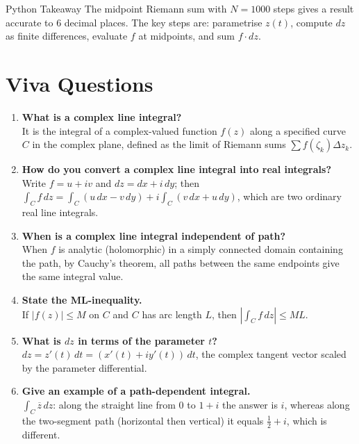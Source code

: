 \documentclass[12pt,a4paper]{article}
\begin{document}
\begin{learnbox}{Python Takeaway}
The midpoint Riemann sum with $N=1000$ steps gives a result accurate to
6 decimal places. The key steps are: parametrise $z(t)$, compute $dz$ as
finite differences, evaluate $f$ at midpoints, and sum $f \cdot dz$.
\end{learnbox}

\section{Viva Questions}
\begin{enumerate}[label=\textbf{V\arabic*.}, leftmargin=*]
  \item \textbf{What is a complex line integral?} \\
        It is the integral of a complex-valued function $f(z)$ along a
        specified curve $C$ in the complex plane, defined as the limit of
        Riemann sums $\sum f(\zeta_k)\Delta z_k$.

  \item \textbf{How do you convert a complex line integral into real integrals?} \\
        Write $f = u + iv$ and $dz = dx + i\,dy$; then
        $\int_C f\,dz = \int_C(u\,dx - v\,dy) + i\int_C(v\,dx + u\,dy)$,
        which are two ordinary real line integrals.

  \item \textbf{When is a complex line integral independent of path?} \\
        When $f$ is analytic (holomorphic) in a simply connected domain
        containing the path, by Cauchy's theorem, all paths between the
        same endpoints give the same integral value.

  \item \textbf{State the ML-inequality.} \\
        If $|f(z)| \le M$ on $C$ and $C$ has arc length $L$, then
        $|\int_C f\,dz| \le ML$.

  \item \textbf{What is $dz$ in terms of the parameter $t$?} \\
        $dz = z'(t)\,dt = (x'(t) + iy'(t))\,dt$, the complex tangent
        vector scaled by the parameter differential.

  \item \textbf{Give an example of a path-dependent integral.} \\
        $\int_C \overline{z}\,dz$: along the straight line from $0$ to
        $1+i$ the answer is $i$, whereas along the two-segment path
        (horizontal then vertical) it equals $\frac{1}{2} + i$, which
        is different.


\end{enumerate}
\end{document}
